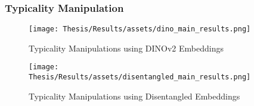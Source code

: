 \FloatBarrier
\subsubsection{Typicality Manipulation}
\begin{figure}[!ht]
    \centering
    \texttt{[image: Thesis/Results/assets/dino\_main\_results.png]}
    \caption[Typicality Manipulations using DINOv2 Embeddings]{Typicality Manipulations using DINOv2 Embeddings}
    \label{fig:dino_main_results}
\end{figure}

\begin{figure}[!ht]
    \centering
    \texttt{[image: Thesis/Results/assets/disentangled\_main\_results.png]}
    \caption[Typicality Manipulations using Disentangled Embeddings]{Typicality Manipulations using Disentangled Embeddings}
    \label{fig:disentangled_main_results}
\end{figure}

